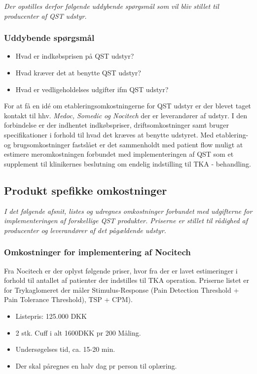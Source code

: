 \textit{Der opstilles derfor følgende uddybende spørgsmål som vil bliv stillet til producenter af QST udstyr. }

\subsubsection*{Uddybende spørgsmål}

\begin{itemize}  
\item Hvad er indkøbsprisen på QST udstyr? 
\item Hvad kræver det at benytte QST udstyr? 
\item Hvad er vedligeholdelses udgifter ifm QST udstyr?
\end{itemize}


For at få en idé om etableringsomkostningerne for QST udstyr er der blevet taget kontakt til hhv. \emph{Medoc, Somedic og Nocitech} der er leverandører af udstyr. I den forbindelse er der indhentet indkøbspriser, driftsomkostninger samt bruger specifikationer i forhold til hvad det kræves at benytte udstyret. Med etablering- og brugsomkostninger fastslået er det sammenholdt med patient flow muligt at estimere meromkostningen forbundet med implementeringen af QST som et supplement til klinikernes beslutning om endelig indstilling til TKA - behandling. 

\subsection{Produkt spefikke omkostninger}
\textit{I det følgende afsnit, listes og udregnes omkostninger forbundet med udgifterne for implementeringen af forskellige QST produkter. Priserne er stillet til rådighed af producenter og leverandører af det pågældende udstyr.}
\subsubsection{Omkostninger for implementering af Nocitech}
\label{priser}

Fra Nocitech er der oplyst følgende priser, hvor fra der er lavet estimeringer i forhold til antallet af patienter der indstilles til TKA operation. Priserne listet er for Trykaglomeret der måler Stimulus-Response (Pain Detection Threshold + Pain Tolerance Threshold), TSP + CPM).

\begin{itemize}  
\item Listepris: 125.000 DKK
\item 2 stk. Cuff i  alt 1600DKK pr 200 Måling.
\item Undersøgelses tid, ca. 15-20 min.
\item Der skal påregnes en halv dag pr person til oplæring.
\end{itemize}

